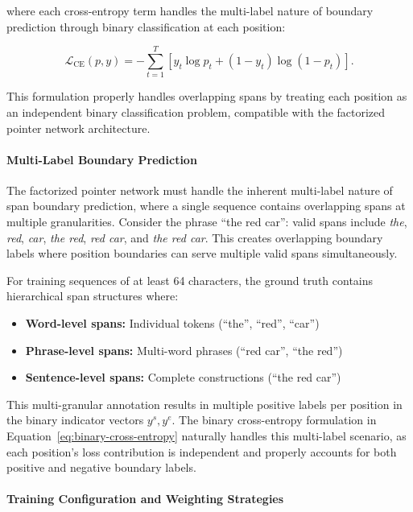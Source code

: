 where each cross-entropy term handles the multi-label nature of boundary prediction through binary classification at each position:

\begin{equation}
\mathcal{L}_{\text{CE}}(p, y) = -\sum_{t=1}^T \left[ y_t \log p_t + (1-y_t) \log (1-p_t) \right].
\label{eq:binary-cross-entropy}
\end{equation}

This formulation properly handles overlapping spans by treating each position as an independent binary classification problem, compatible with the factorized pointer network architecture.

\paragraph{Multi-Label Boundary Prediction}

The factorized pointer network must handle the inherent multi-label nature of span boundary prediction, where a single sequence contains overlapping spans at multiple granularities. Consider the phrase ``the red car'': valid spans include \emph{the}, \emph{red}, \emph{car}, \emph{the red}, \emph{red car}, and \emph{the red car}. This creates overlapping boundary labels where position boundaries can serve multiple valid spans simultaneously.

For training sequences of at least 64 characters, the ground truth contains hierarchical span structures where:
\begin{itemize}
	\item \textbf{Word-level spans:} Individual tokens (``the'', ``red'', ``car'')
	\item \textbf{Phrase-level spans:} Multi-word phrases (``red car'', ``the red'')
	\item \textbf{Sentence-level spans:} Complete constructions (``the red car'')
\end{itemize}

This multi-granular annotation results in multiple positive labels per position in the binary indicator vectors \(y^s, y^e\). The binary cross-entropy formulation in Equation~\eqref{eq:binary-cross-entropy} naturally handles this multi-label scenario, as each position's loss contribution is independent and properly accounts for both positive and negative boundary labels.

\paragraph{Training Configuration and Weighting Strategies}

